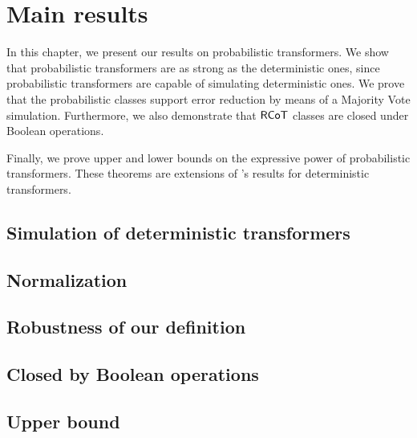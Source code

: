 \chapter{Main results}

In this chapter, we present our results on probabilistic transformers.
We show that probabilistic transformers are as strong as the deterministic ones, since probabilistic transformers are capable of simulating deterministic ones.
We prove that the probabilistic classes support error reduction by means of a Majority Vote simulation.
Furthermore, we also demonstrate that $\mathsf{RCoT}$ classes are closed under Boolean operations.

Finally, we prove upper and lower bounds on the expressive power of probabilistic transformers.
These theorems are extensions of \citet{toyota}'s results for deterministic transformers.



\section{Simulation of deterministic transformers}



\section{Normalization}



\section{Robustness of our definition}\label{error-reduction}



\section{Closed by Boolean operations}\label{prob-bool}



\section{Upper bound}\label{section-prob-upper-bound}

